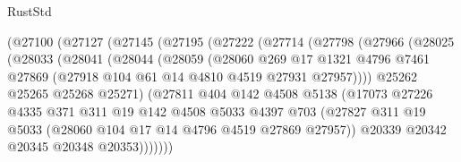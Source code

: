 \begin{lexlean}{RustStd}
\begin{coremodule}
{\begin{coremodule}
{{{{{{{{{{{{{{{{{{{{{{{{{{{{{{{{{{{{{{{{{{{{{{{{{{{{{{{                      (@27100
                        (@27127
                          (@27145
                            (@27195
                              (@27222
                                (@27714
                                  (@27798
                                    (@27966
                                      (@28025
                                        (@28033
                                          (@28041
                                            (@28044
                                              (@28059
                                                (@28060
                                                  @269
                                                  @17
                                                  @1321
                                                  @4796
                                                  @7461
                                                  @27869
                                                  (@27918 @104 @61 @14 @4810 @4519 @27931 @27957))))
                                            @25262
                                            @25265
                                            @25268
                                            @25271)
                                          (@27811
                                            @404
                                            @142
                                            @4508
                                            @5138
                                            (@17073
                                              @27226
                                              @4335
                                              @371
                                              @311
                                              @19
                                              @142
                                              @4508
                                              @5033
                                              @4397
                                              @703
                                              (@27827
                                                @311
                                                @19
                                                @5033
                                                (@28060 @104 @17 @14 @4796 @4519 @27869 @27957))
                                              @20339
                                              @20342
                                              @20345
                                              @20348
                                              @20353)))))))
}}}}}}}}}}}}}}}}}}}}}}}}}}}}}}}}}}}}}}}}}}}}}}}}}}}}}}}
\end{coremodule}}
\end{coremodule}
\end{lexlean}
